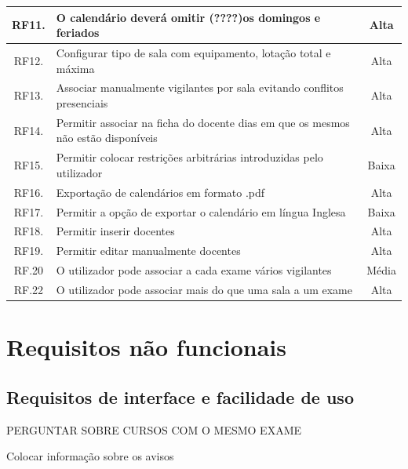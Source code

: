 \documentclass[11pt, twoside]{report}
\begin{document}
\begin{center}
\begin{tabularx}{\textwidth}{|c|X|c|}
				\hline
				RF11. & O calendário deverá omitir (????)os domingos e feriados & Alta \\
				\hline
				RF12. & Configurar tipo de sala com equipamento, lotação total e máxima & Alta \\
				\hline
				RF13. & Associar manualmente vigilantes por sala evitando conflitos presenciais & Alta \\
				\hline
				RF14. & Permitir associar na ficha do docente dias em que os mesmos não estão disponíveis & Alta\\
				\hline
				RF15. & Permitir colocar restrições arbitrárias introduzidas pelo utilizador & Baixa \\
				\hline
				RF16. & Exportação de calendários em formato .pdf & Alta \\
				\hline
				RF17. & Permitir a opção de exportar o calendário em língua Inglesa & Baixa \\
				\hline
				RF18. & Permitir inserir docentes &Alta\\
				\hline
				RF19. & Permitir editar manualmente docentes & Alta\\
				\hline
				RF.20 &O utilizador pode associar a cada exame vários vigilantes&Média\\
				\hline
				RF.22 &	O utilizador pode associar mais do que uma sala a um exame&Alta\\
				\hline
			\end{tabularx}
	\end{center}

	
	\section{Requisitos não funcionais}
	\subsection{Requisitos de interface e facilidade de uso}
	PERGUNTAR SOBRE CURSOS COM O MESMO EXAME
	
	Colocar informação sobre os avisos
	
\end{document}
